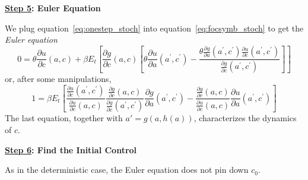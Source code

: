 \documentclass[\topdir/lecture\_notes.tex]{subfiles}
\begin{document}
\textbf{\underline{Step 5}: Euler Equation}

We plug equation~\eqref{eq:onestep_stoch} into equation~\eqref{eq:focsymb_stoch} to get the \emph{Euler equation}
\begin{equation*}
0=\theta\frac{\partial u}{\partial c}(a,c)+\beta E_{t}\left[\frac{\partial g}{\partial c}(a,c)\left[\theta\frac{\partial u}{\partial a}(a^{\prime},c^{\prime})-\frac{\theta\frac{\partial g}{\partial a}(a^{\prime},c^{\prime})\frac{\partial u}{\partial c}(a^{\prime},c^{\prime})}{\frac{\partial g}{\partial c}(a^{\prime},c^{\prime})}\right]\right]
\end{equation*}
or, after some manipulations,
\begin{equation*}
1=\beta E_{t}\left[\frac{\frac{\partial u}{\partial c}(a^{\prime},c^{\prime})}{\frac{\partial u}{\partial c}(a,c)}\frac{\frac{\partial g}{\partial c}(a,c)}{\frac{\partial g}{\partial c}(a^{\prime},c^{\prime})}\frac{\partial g}{\partial a}(a^{\prime},c^{\prime})-\frac{\frac{\partial g}{\partial c}(a,c)}{\frac{\partial u}{\partial c}(a,c)}\frac{\partial u}{\partial a}(a^{\prime},c^{\prime})\right] \label{eq: Euler_stoch}
\end{equation*}
The last equation, together with $a'=g(a,h(a))$, characterizes the dynamics of $c$.

\textbf{\underline{Step 6}: Find the Initial Control}

As in the deterministic case, the Euler equation does not pin down $c_0$.
\end{document}
